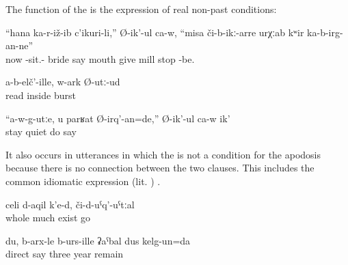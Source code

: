 The function of the  is the expression of real non-past conditions: 
%
\begin{exe}
	\ex	\label{ex:‎The bride who just married}
	\gll	``hana	ka-r-iž-ib	c'ikuri-li,''	Ø-ik'-ul	ca-w,	``misa či-b-ikː-arre	urχːab	kʷir	ka-b-irg-an-ne''\\
		now	-sit.-	bride	say		mouth	give	mill	stop	-be.\\
	\glt	{}

	\ex	\label{ex:If I do not read (my song), I burst inside.}
	\gll	a-b-elč'-ille,	w-ark	Ø-utː-ud\\
		read	\tsc{m-}inside	burst\\
	\glt	{}

	\ex	\label{ex:‎‎‎If you (= masc.) do not calm down, I make you calm, he says}
	\gll	``a-w-g-utːe,	u	parʁat	Ø-irq'-an=de,''	Ø-ik'-ul	ca-w	ik'\\
		stay		quiet	do	say		\\
	\glt	{}
\end{exe}

It also occurs in utterances in which the  is not a condition for the apodosis because there is no  connection between the two clauses. This includes the common idiomatic expression  (lit. ) .
%
\begin{exe}
	\ex	\label{ex:‎‎There is much there (i.e. the graveyard is large), if you go there}
	\gll	celi d-aqil	k'e-d,	či-d-uˁq'-uˁtːal\\
		whole	much	exist		go\\
	\glt	{}

	\ex	\label{ex:I, to be honest, remained for three years.}
	\gll	du,	b-arx-le	b-urs-ille	ʡaˁbal	dus	kelg-un=da\\
			direct	say		three	year	remain\\
	\glt	{}
\end{exe}

